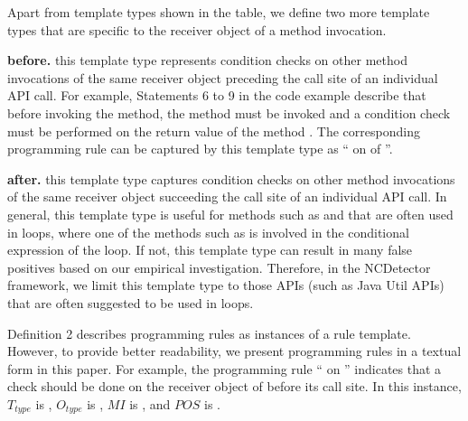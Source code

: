 Apart from template types shown in the table, we define two more template types
that are specific to the receiver object of a method invocation. 

\textbf{before.} this template type represents condition checks 
on other method invocations of the same receiver object preceding the call site of 
an individual API call. For example, Statements 6 to 9 in the code example
describe that before invoking the  method, the method  must
be invoked and a condition check must be performed on the return value of the method .
The corresponding programming rule can be captured by this template type as `` on  of   ''.

\textbf{after.} this template type captures condition checks on other method invocations
of the same receiver object succeeding the call site of an individual API call. In general, 
this template type is useful for methods such as  and 
 that are often used in loops, where
one of the methods such as  is involved in the conditional expression of the loop. If not,
this template type can result in many false positives based on our
empirical investigation. Therefore, in the NCDetector framework,
we limit this template type to those APIs (such as Java Util APIs) that are often
suggested to be used in loops.

Definition 2 describes programming rules as instances of a rule template. However,
to provide better readability, we present programming rules in a textual form in this paper. 
For example, the programming rule `` on ''
indicates that a  check should be done on the receiver object of 
 before its call site. In this instance, $T_{type}$ is ,
$O_{type}$ is , $MI$ is , and $POS$ is .